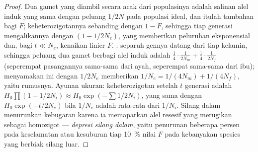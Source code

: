 \begin{proof}
Dua gamet yang diambil secara acak dari populasinya adalah salinan alel
induk yang sama dengan peluang $1/2N$ pada populasi ideal, dan itulah
tambahan bagi $F$; keheterozigotannya sebanding dengan $1 - F$, sehingga
tiap generasi mengalikannya dengan $(1 - 1/2N_{e})$, yang memberikan
peluruhan eksponensial dan, bagi $t \ll N_{e}$, kenaikan linier $F$.
: separuh gennya datang dari tiap kelamin, sehingga peluang
dua gamet berbagi alel induk adalah $\tfrac{1}{4}\cdot\tfrac{1}{2N_{m}} +
\tfrac{1}{4}\cdot\tfrac{1}{2N_{f}}$ (seperempat pasangannya sama-sama dari
ayah, seperempat sama-sama dari ibu); menyamakan ini dengan $1/2N_{e}$
memberikan $1/N_{e} = 1/(4N_{m}) + 1/(4N_{f})$, yaitu rumusnya. Ayunan
ukuran: keheterozigotan setelah $t$ generasi adalah $H_{0}\prod(1 - 1/2N_{i})
\approx H_{0}\exp(-\sum 1/2N_{i})$, yang sama dengan $H_{0}\exp(-t/2N_{e})$
bila $1/N_{e}$ adalah rata-rata dari $1/N_{i}$. Silang dalam menurunkan
kebugaran karena ia memaparkan alel resesif yang merugikan sebagai
homozigot --- \emph{depresi silang dalam}, yaitu penurunan beberapa persen
pada keselamatan atau kesuburan tiap \qty{10}{\%} nilai $F$ pada kebanyakan
spesies yang berbiak silang luar.
\end{proof}

